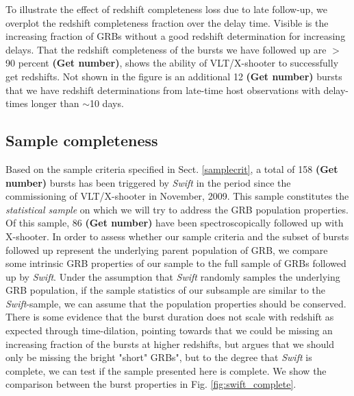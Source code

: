 \documentclass{aa}    %
\newcommand\todo[1]{\textbf{(#1)}}
\begin{document}
To illustrate the effect of redshift completeness loss due to late follow-up, we
overplot the redshift completeness fraction over the delay time. Visible is the
increasing fraction of GRBs without a good redshift determination for increasing
delays. That the redshift completeness of the bursts we have followed up are $>$
90 percent \todo{Get number}, shows the ability of VLT/X-shooter to successfully
get redshifts. Not shown in the figure is an additional 12 \todo{Get number}
bursts that we have redshift determinations from late-time host observations
with delay-times longer than $\sim$10 days.


\subsection{Sample completeness} \label{completeness}

Based on the sample criteria specified in Sect. \ref{samplecrit}, a total of 158
\todo{Get number} bursts has been triggered by \textit{Swift} in the period
since the commissioning of VLT/X-shooter in November, 2009. This sample
constitutes the \textit{statistical sample} on which we will try to address the
GRB population properties. Of this sample, 86 \todo{Get number} have been
spectroscopically followed up with X-shooter. In order to assess whether our
sample criteria and the subset of bursts followed up represent the underlying
parent population of GRB, we compare some intrinsic GRB properties of our sample
to the full sample of GRBs followed up by \textit{Swift}. Under the assumption
that \textit{Swift} randomly samples the underlying GRB population, if the
sample statistics of our subsample are similar to the \textit{Swift}-sample, we
can assume that the population properties should be conserved. There is some
evidence that the burst duration does not scale with redshift as expected
through time-dilation\citep{Kocevski2013, Littlejohns2013a}, pointing towards
that we could be missing an increasing fraction of the bursts at higher
redshifts, but \citet{Lien2016} argues that we should only be missing the bright
"short" GRBs", but to the degree that \textit{Swift} is complete, we can test if
the sample presented here is complete. We show the comparison between the burst
properties in Fig. \ref{fig:swift_complete}.
\end{document}
